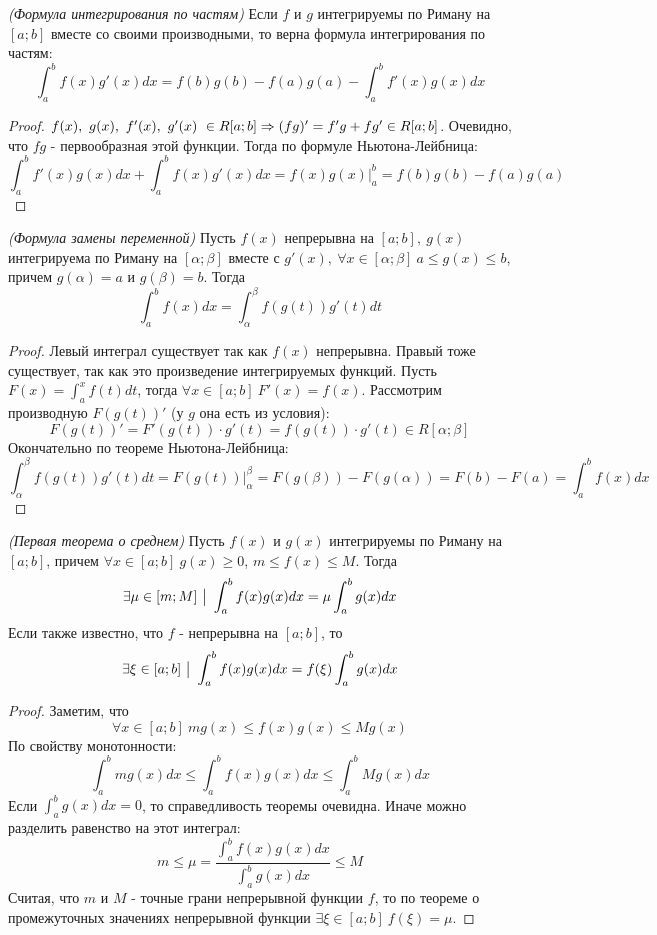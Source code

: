 \begin{corollary} \textit{(Формула интегрирования по частям)}
	Если $f$ и $g$ интегрируемы по Риману на $[a;b]$ вместе со своими производными, то верна формула интегрирования по частям:
	\[
		\int_a^bf(x)g'(x)dx = f(b)g(b) - f(a)g(a) - \int_a^bf'(x)g(x)dx
	\]
\end{corollary}

\begin{proof}
	$\\ f(x),\ g(x),\ f'(x),\ g'(x)\ \in R[a;b] \Ra (fg)'= f'g + fg' \in R[a;b]$.
	Очевидно, что $fg$ - первообразная этой функции. Тогда по формуле Ньютона-Лейбница:
	\[
		\int_a^bf'(x)g(x)dx + \int_a^bf(x)g'(x)dx = f(x)g(x)\Bigg |^b_a = f(b)g(b) - f(a)g(a)
	\]
\end{proof}

\begin{theorem} \textit{(Формула замены переменной)}
	Пусть $f(x)$ непрерывна на $[a;b],\ g(x)$ интегрируема по Риману на $[\alpha; \beta]$ вместе с $g'(x),\ \forall x \in [\alpha; \beta]\ a \leq g(x) \leq b$, причем $g(\alpha) = a\text{ и } g(\beta) = b$. Тогда 
	\[
		\int_a^bf(x)dx = \int_\alpha^\beta f(g(t))g'(t)dt
	\]
\end{theorem}

\begin{proof}
	Левый интеграл существует так как $f(x)$ непрерывна. Правый тоже существует, так как это произведение интегрируемых функций.
	Пусть $F(x) = \int_a^xf(t)dt$, тогда $\forall x \in [a;b]\ F'(x) = f(x)$.
	Рассмотрим производную $F(g(t))'$ (у $g$ она есть из условия):
	\[
		F(g(t))' = F'(g(t))\cdot g'(t) = f(g(t))\cdot g'(t) \in R[\alpha;\beta]
	\]
	Окончательно по теореме Ньютона-Лейбница:
	\[
		\int_\alpha^\beta f(g(t))g'(t)dt = F(g(t)) \Biggr |_\alpha^\beta = F(g(\beta)) - F(g(\alpha))= F(b) - F(a) = \int_a^bf(x)dx
	\]
\end{proof}

\begin{theorem} \textit{(Первая теорема о среднем)}
	Пусть $f(x)$ и $g(x)$ интегрируемы по Риману на $[a;b]$, причем $\forall x \in [a;b]\ g(x) \geq 0$, $m \leq f(x) \leq M$. Тогда 
	\[
		\exists \mu \in [m;M] \ \big|\  \int_a^bf(x)g(x)dx = \mu \int_a^bg(x)dx
	\]
	Если также известно, что $f$ - непрерывна на $[a;b]$, то 
	\[
		\exists \xi \in [a;b]\ \big|\  \int_a^bf(x)g(x)dx = f(\xi)\int_a^bg(x)dx
	\]
\end{theorem}

\begin{proof}
	Заметим, что
	\[
		\forall x\in [a;b]\ mg(x) \leq f(x)g(x) \leq Mg(x)
	\]
	По свойству монотонности:
	\[
		\int_a^b mg(x)dx \leq \int_a^b f(x)g(x)dx \leq \int_a^b Mg(x)dx
	\]
	Если $\int_a^bg(x)dx = 0$, то справедливость теоремы очевидна.
	Иначе можно разделить равенство на этот интеграл:
	\[
		m \leq \mu = \frac{\int_a^b f(x)g(x)dx}{\int_a^b g(x)dx} \leq M
	\]
	Считая, что $m$ и $M$ - точные грани непрерывной функции $f$, то по теореме о промежуточных значениях непрерывной функции $\exists \xi \in [a;b]\ f(\xi) = \mu$.
\end{proof}

